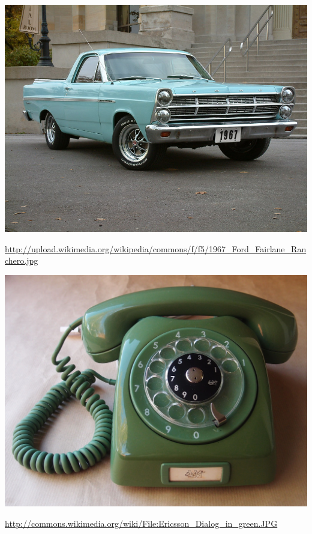 \documentclass[aspectratio=169]{beamer}
\begin{document}
\begin{frame}

\begin{center}
\includegraphics[height=0.8\textheight]{figures/1967_Ford_Fairlane_Ranchero.jpg}
\end{center}

\vfill
\tiny{\url{http://upload.wikimedia.org/wikipedia/commons/f/f5/1967_Ford_Fairlane_Ranchero.jpg}}

\end{frame}
\begin{frame}

\begin{center}
\includegraphics[height=0.8\textheight]{figures/Ericsson_Dialog_in_green}
\end{center}

\vfill
\tiny{\url{http://commons.wikimedia.org/wiki/File:Ericsson_Dialog_in_green.JPG}}

\end{frame}
\end{document}
